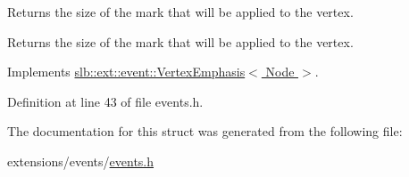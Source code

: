 Returns the size of the mark that will be applied to the vertex. 

\begin{DoxyReturn}{Returns}
the size of the mark that will be applied to the vertex. 
\end{DoxyReturn}


Implements \hyperlink{structslb_1_1ext_1_1event_1_1VertexEmphasis_ae474f58607e671c9da688e316178c29c}{slb\+::ext\+::event\+::\+Vertex\+Emphasis$<$ Node $>$}.



Definition at line 43 of file events.\+h.



The documentation for this struct was generated from the following file\+:\begin{DoxyCompactItemize}
\item 
extensions/events/\hyperlink{events_8h}{events.\+h}\end{DoxyCompactItemize}
